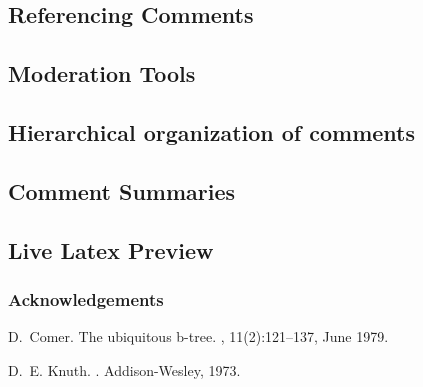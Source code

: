 \documentclass[a4paper]{article}
\begin{document}
\subsection{Referencing Comments}

\subsection{Moderation Tools}

\subsection{Hierarchical organization of comments}

\subsection{Comment Summaries}

\subsection{Live Latex Preview}

\subsubsection*{Acknowledgements}


% 
%

\begin{thebibliography}{Com79}

D.~Comer.
\newblock The ubiquitous b-tree.
, 11(2):121--137, June 1979.

D.~E. Knuth.
.
\newblock Addison-Wesley, 1973.

\end{thebibliography}
\end{document}
